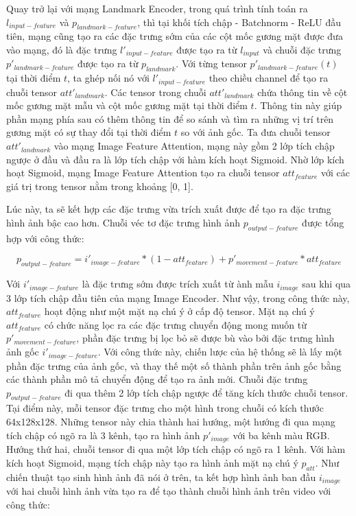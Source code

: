 Quay trở lại với mạng Landmark Encoder, trong quá trình tính toán ra $l_{input-feature}$ và $p_{landmark-feature}$, thì tại khối tích chập - Batchnorm - ReLU đầu tiên, mạng cũng tạo ra các đặc trưng sớm của các cột mốc gương mặt được đưa vào mạng, đó là đặc trưng $l'_{input-feature}$ được tạo ra từ $l_{input}$ và chuỗi đặc trưng $p'_{landmark-feature}$ được tạo ra từ $p_{landmark}$. Với từng tensor $p'_{landmark-feature}(t)$ tại thời điểm $t$, ta ghép nối nó với $l'_{input-feature}$ theo chiều channel để tạo ra chuỗi tensor $att'_{landmark}$. Các tensor trong chuỗi $att'_{landmark}$ chứa thông tin về cột mốc gương mặt mẫu và cột mốc gương mặt tại thời điểm $t$. Thông tin này giúp phần mạng phía sau có thêm thông tin để so sánh và tìm ra những vị trí trên gương mặt có sự thay đổi tại thời điểm $t$ so với ảnh gốc. Ta đưa chuỗi tensor $att'_{landmark}$ vào mạng Image Feature Attention, mạng này gồm 2 lớp tích chập ngược ở đầu và đầu ra là lớp tích chập với hàm kích hoạt Sigmoid. Nhờ lớp kích hoạt Sigmoid, mạng Image Feature Attention tạo ra chuỗi tensor $att_{feature}$ với các giá trị trong tensor nằm trong khoảng [0, 1]. 

Lúc này, ta sẽ kết hợp các đặc trưng vừa trích xuất được để tạo ra đặc trưng hình ảnh bậc cao hơn. Chuỗi véc tơ đặc trưng hình ảnh $p_{output-feature}$ được tổng hợp với công thức:

\begin{equation}
    p_{output-feature}=i'_{image-feature}*(1-att_{feature})+p'_{movement-feature}*att_{feature}
\end{equation}

Với $i'_{image-feature}$ là đặc trưng sớm được trích xuất từ ành mẫu $i_{image}$ sau khi qua 3 lớp tích chập đầu tiên của mạng Image Encoder. Như vậy, trong công thức này, $att_{feature}$ hoạt động như một mặt nạ chú ý ở cấp độ tensor. Mặt nạ chú ý $att_{feature}$ có chức năng lọc ra các đặc trưng chuyển động mong muốn từ $p'_{movement-feature}$, phần đặc trưng bị lọc bỏ sẽ được bù vào bởi đặc trưng hình ảnh gốc $i'_{image-feature}$. Với công thức này, chiến lược của hệ thống sẽ là lấy một phần đặc trưng của ảnh gốc, và thay thế một số thành phần trên ảnh gốc bằng các thành phần mô tả chuyển động để tạo ra ảnh mới. Chuỗi đặc trưng $p_{output-feature}$ đi qua thêm 2 lớp tích chập ngược để tăng kích thước chuỗi tensor. Tại điểm này, mỗi tensor đặc trưng cho một hình trong chuỗi có kích thước 64x128x128. Những tensor này chia thành hai hướng, một hướng đi qua mạng tích chập có ngõ ra là 3 kênh, tạo ra hình ảnh $p'_{image}$ với ba kênh màu RGB. Hướng thứ hai, chuỗi tensor đi qua một lớp tích chập có ngõ ra 1 kênh. Với hàm kích hoạt Sigmoid, mạng tích chập này tạo ra hình ảnh mặt nạ chú ý $p_{att}$. Như chiến thuật tạo sinh hình ảnh đã nói ở trên, ta kết hợp hình ảnh ban đầu $i_{image}$ với hai chuỗi hình ảnh vừa tạo ra để tạo thành chuỗi hình ảnh trên video với công thức:

